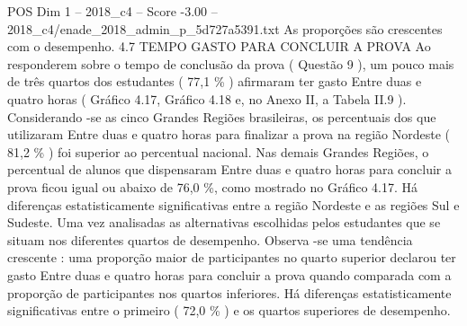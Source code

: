 \begin{textsample}{POS Dim 1 – 2018\_c4 – Score -3.00 – 2018\_c4/enade\_2018\_admin\_p\_5d727a5391.txt}
As proporções são crescentes com o desempenho. 4.7 TEMPO GASTO PARA CONCLUIR A PROVA Ao responderem sobre o tempo de conclusão da prova ( Questão 9 ), um pouco mais de três quartos dos estudantes ( 77,1 \% ) afirmaram ter gasto Entre duas e quatro horas ( Gráfico 4.17, Gráfico 4.18 e, no Anexo II, a Tabela II.9 ).
Considerando -se as cinco Grandes Regiões brasileiras, os percentuais dos que utilizaram Entre duas e quatro horas para finalizar a prova na região Nordeste ( 81,2 \% ) foi superior ao percentual nacional.
Nas demais Grandes Regiões, o percentual de alunos que dispensaram Entre duas e quatro horas para concluir a prova ficou igual ou abaixo de 76,0 \%, como mostrado no Gráfico 4.17.
Há diferenças estatisticamente significativas entre a região Nordeste e as regiões Sul e Sudeste.
Uma vez analisadas as alternativas escolhidas pelos estudantes que se situam nos diferentes quartos de desempenho.
Observa -se uma tendência crescente : uma proporção maior de participantes no quarto superior declarou ter gasto Entre duas e quatro horas para concluir a prova quando comparada com a proporção de participantes nos quartos inferiores.
Há diferenças estatisticamente significativas entre o primeiro ( 72,0 \% ) e os quartos superiores de desempenho.

\end{textsample}
